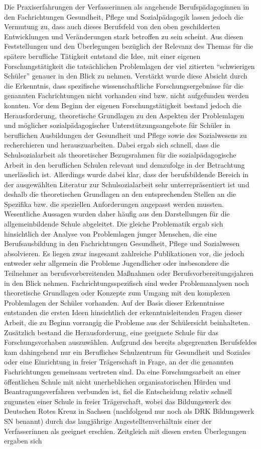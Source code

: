 Die Praxiserfahrungen der Verfasserinnen als angehende Berufspädagoginnen in den Fachrichtungen Gesundheit, Pflege und Sozialpädagogik lassen jedoch die Vermutung zu, dass auch dieses Berufsfeld von den oben geschilderten Entwicklungen und Veränderungen stark betroffen zu sein scheint. Aus diesen Feststellungen und den Überlegungen bezüglich der Relevanz des Themas für die spätere berufliche Tätigkeit entstand die Idee, mit einer eigenen Forschungstätigkeit die tatsächlichen Problemlagen der viel zitierten "`schwierigen Schüler"' genauer in den Blick zu nehmen. Verstärkt wurde diese Absicht durch die Erkenntnis, dass spezifische wissenschaftliche Forschungsergebnisse für die genannten Fachrichtungen nicht vorhanden sind bzw. nicht aufgefunden werden konnten. Vor dem Beginn der eigenen Forschungstätigkeit bestand jedoch die Herausforderung, theoretische Grundlagen zu den Aspekten der Problemlagen und möglicher sozialpädagogischer Unterstützungsangebote für Schüler in beruflichen Ausbildungen der Gesundheit und Pflege sowie des Sozialwesens zu recherchieren und herauszuarbeiten. Dabei ergab sich schnell, dass die Schulsozialarbeit als theoretischer Bezugsrahmen für die sozial\-pä\-da\-gogische Arbeit in den beruflichen Schulen relevant und demzufolge in der Betrachtung unerlässlich ist. Allerdings wurde dabei klar, dass der berufsbildende Bereich in der ausgewählten Literatur zur Schulsozialarbeit sehr unterrepräsentiert ist und deshalb die theoretischen Grundlagen an den entsprechenden Stellen an die Spezifika bzw. die speziellen Anforderungen angepasst werden mussten. Wesentliche Aussagen wurden daher häufig aus den Darstellungen für die allgemeinbildende Schule abgeleitet. Die gleiche Problematik ergab sich hinsichtlich der Analyse von Problemlagen junger Menschen, die eine Berufsausbildung in den Fachrichtungen Gesundheit, Pflege und Sozialwesen absolvieren. Es liegen zwar insgesamt zahlreiche Publikationen vor, die jedoch entweder sehr allgemein die Probleme Jugendlicher oder insbesondere die Teilnehmer an berufsvorbereitenden Maßnahmen oder Berufsvorbereitungsjahren in den Blick nehmen. Fachrichtungsspezifisch sind weder Problemanalysen noch theoretische Grundlagen oder Konzepte zum Umgang mit den komplexen Problemlagen der Schüler vorhanden. Auf der Basis dieser Erkenntnisse entstanden die ersten Ideen hinsichtlich der erkenntnisleitenden Fragen dieser Arbeit, die zu Beginn vorrangig die Probleme aus der Schülersicht beinhalteten. Zusätzlich bestand die Herausforderung, eine geeignete Schule für das Forschungsvorhaben auszuwählen. Aufgrund des bereits abgegrenzten Berufsfeldes kam dahingehend nur ein Berufliches Schulzentrum für Gesundheit und Soziales oder eine Einrichtung in freier Trägerschaft in Frage, an der die genannten Fachrichtungen gemeinsam vertreten sind. Da eine Forschungsarbeit an einer öffentlichen Schule mit nicht unerheblichen organisatorischen Hürden und Beantragungsverfahren verbunden ist, fiel die Entscheidung relativ schnell zugunsten einer Schule in freier Trägerschaft, wobei das Bildungswerk des Deutschen Rotes Kreuz in Sachsen (nachfolgend nur noch als DRK Bildungswerk SN benannt) durch das langjährige Angestelltenverhältnis einer der Verfasserinnen als geeignet erschien. Zeitgleich mit diesen ersten Überlegungen ergaben sich 